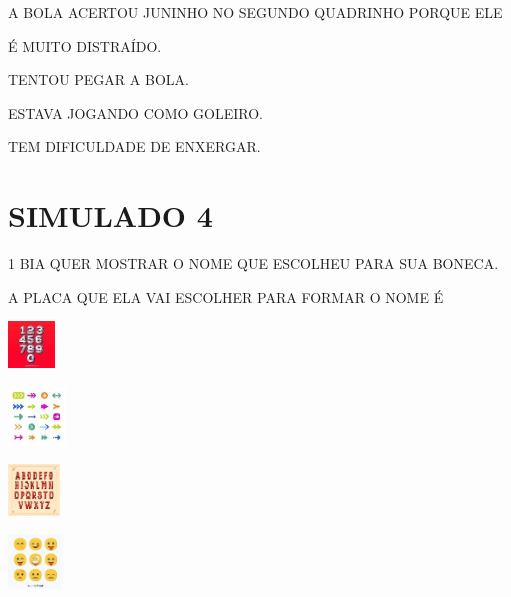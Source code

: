
A BOLA ACERTOU JUNINHO NO SEGUNDO QUADRINHO PORQUE ELE

\begin{escolha}
\item É MUITO DISTRAÍDO.

\item TENTOU PEGAR A BOLA. 

\item ESTAVA JOGANDO COMO GOLEIRO.

\item TEM DIFICULDADE DE ENXERGAR.
\end{escolha}


\chapter{SIMULADO 4}

\num{1} BIA QUER MOSTRAR O NOME QUE ESCOLHEU PARA SUA BONECA.

A PLACA QUE ELA VAI ESCOLHER PARA FORMAR O NOME É

\begin{escolha}
\item \includegraphics[width=0.48889in,height=0.48889in]{media/image239.jpg}

\item \includegraphics[width=0.60625in,height=0.60625in]{media/image240.jpg}

\item \includegraphics[width=0.54236in,height=0.54236in]{media/image241.jpg}

\item \includegraphics[width=0.57431in,height=0.57431in]{media/image242.jpg}
\end{escolha}


